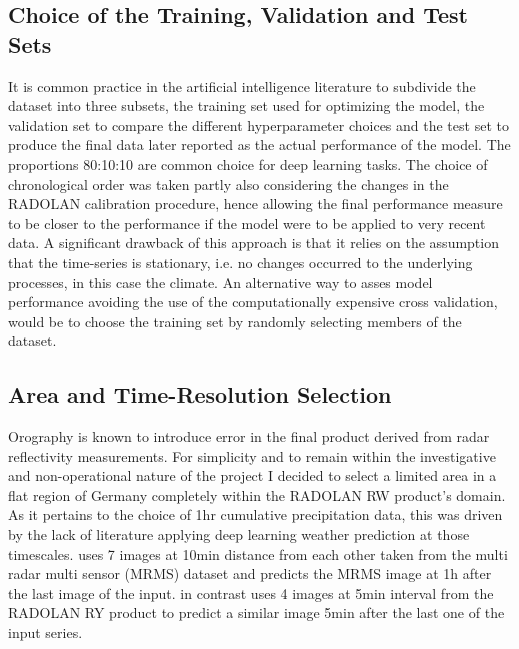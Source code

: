\subsection{Choice of the Training, Validation and Test Sets}
It is common practice in the artificial intelligence literature to subdivide the dataset into three subsets, the training set used for optimizing the model, the validation set to compare the different hyperparameter choices and the test set to produce the final data later reported as the actual performance of the model. The proportions 80:10:10 are common choice for deep learning tasks. The choice of chronological order was taken partly also considering the changes in the RADOLAN calibration procedure, hence allowing the final performance measure to be closer to the performance if the model were to be applied to very recent data. A significant drawback of this approach is that it relies on the assumption that the time-series is stationary, i.e. no changes occurred to the underlying processes, in this case the climate. An alternative way to asses model performance avoiding the use of the computationally expensive cross validation, would be to choose the training set by randomly selecting members of the dataset.

\subsection{Area and Time-Resolution Selection}
Orography is known to introduce error in the final product derived from radar reflectivity measurements. For simplicity and to remain within the investigative and non-operational nature of the project I decided to select a limited area in a flat region of Germany completely within the RADOLAN RW product's domain. As it pertains to the choice of 1hr cumulative precipitation data, this was driven by the lack of literature applying deep learning weather prediction at those timescales. \citet{Agrawal2019MachineImages} uses 7 images at 10min distance from each other taken from the multi radar multi sensor (MRMS) dataset and predicts the MRMS image at 1h after the last image of the input. \citet{Ayzel2020RainNetNowcasting} in contrast uses 4 images at 5min interval from the RADOLAN RY product to predict a similar image 5min after the last one of the input series.

